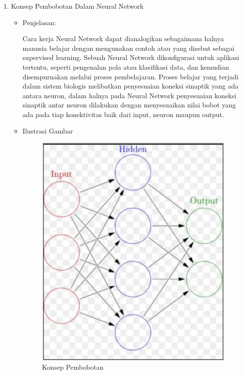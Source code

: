 \begin{enumerate}
\begin{itemize}
\end{itemize}

\item Konsep Pembobotan Dalam Neural Network
\begin{itemize}
\item Penjelasan:
\par Cara kerja Neural Network dapat dianalogikan sebagaimana halnya manusia belajar dengan mengunakan contoh atau yang disebut sebagai supervised learning. Sebuah Neural Network dikonfigurasi untuk aplikasi tertentu, seperti pengenalan pola atau klasifikasi data, dan kemudian disempurnakan melalui proses pembelajaran. Proses belajar yang terjadi dalam sistem biologis melibatkan penyesuaian koneksi sinaptik yang ada antara neuron, dalam halnya pada Neural Network penyesuaian koneksi sinaptik antar neuron dilakukan dengan menyesuaikan nilai bobot yang ada pada tiap konektivitas baik dari input, neuron maupun output.

\item Ilustrasi Gambar
\begin{figure}[!hbtp]
\centering
\includegraphics[scale=0.3]{figures/andi/63.PNG}
\caption{Konsep Pembobotan}
\label{Contoh 3}
\end{figure}


\end{itemize}
\end{enumerate}
